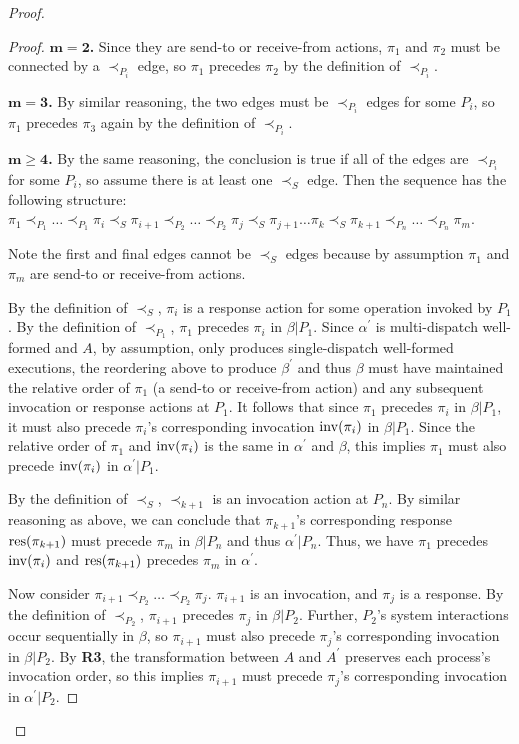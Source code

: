 \begin{proof}
\begin{proof}
      $\mathbf{m=2}$\textbf{.} Since they are send-to or receive-from actions, $\pi_1$ and $\pi_2$ must be connected by a $\prec_{P_i}$ edge, so $\pi_1$ precedes $\pi_2$ by the definition of $\prec_{P_i}$.

      $\mathbf{m=3}$\textbf{.} By similar reasoning, the two edges must be $\prec_{P_i}$ edges for some $P_i$, so $\pi_1$ precedes $\pi_3$ again by the definition of $\prec_{P_i}$.

      $\mathbf{m \geq 4}$\textbf{.} By the same reasoning, the conclusion is true if all of the edges are $\prec_{P_i}$ for some $P_i$, so assume there is at least one $\prec_S$ edge.
      Then the sequence has the following structure:
      $\pi_1 \prec_{P_1} \ldots \prec_{P_1} \pi_i \prec_S \pi_{i+1} \prec_{P_2} … \prec_{P_2} \pi_j \prec_S \pi_{j+1} … \pi_k \prec_S \pi_{k+1} \prec_{P_n} … \prec_{P_n} \pi_m$.

      Note the first and final edges cannot be $\prec_S$ edges because by assumption $\pi_1$ and $\pi_m$ are send-to or receive-from actions.

      By the definition of $\prec_S$, $\pi_i$ is a response action for some operation invoked by $P_1$. By the definition of $\prec_{P_1}$, $\pi_1$ precedes $\pi_i$ in $\beta | P_1$. Since $\alpha^\prime$ is multi-dispatch well-formed and $A$, by assumption, only produces single-dispatch well-formed executions, the reordering above to produce $\beta^\prime$ and thus $\beta$ must have maintained the relative order of $\pi_1$ (a send-to or receive-from action) and any subsequent invocation or response actions at $P_1$. It follows that since $\pi_1$ precedes $\pi_i$ in $\beta | P_1$, it must also precede $\pi_i$’s corresponding invocation $\operatorname{inv}(\pi_i)$ in $\beta | P_1$. Since the relative order of $\pi_1$ and $\operatorname{inv}(\pi_i)$ is the same in $\alpha^\prime$ and $\beta$, this implies $\pi_1$ must also precede $\operatorname{inv}(\pi_i)$ in $\alpha^\prime | P_1$.

      By the definition of $\prec_S$, $\prec_{k+1}$ is an invocation action at $P_n$. By similar reasoning as above, we can conclude that $\pi_{k+1}$’s corresponding response $\operatorname{\operatorname{res}}(\pi_{k+1})$ must precede $\pi_m$ in $\beta | P_n$ and thus $\alpha^\prime | P_n$. Thus, we have $\pi_1$ precedes $\operatorname{inv}(\pi_i)$ and $\operatorname{\operatorname{res}}(\pi_{k+1})$ precedes $\pi_m$ in $\alpha^\prime$.

      Now consider $\pi_{i+1} \prec_{P_2} \ldots \prec_{P_2} \pi_j$. $\pi_{i+1}$ is an invocation, and $\pi_j$ is a response. By the definition of $\prec_{P_2}$, $\pi_{i+1}$ precedes $\pi_j$ in $\beta | P_2$. Further, $P_2$’s system interactions occur sequentially in $\beta$, so $\pi_{i+1}$ must also precede $\pi_j$’s corresponding invocation in $\beta | P_2$. By \textbf{R3}, the transformation between $A$ and $A^\prime$ preserves each process’s invocation order, so this implies $\pi_{i+1}$ must precede $\pi_j$’s corresponding invocation in $\alpha^\prime | P_2$.


\end{proof}
\end{proof}
